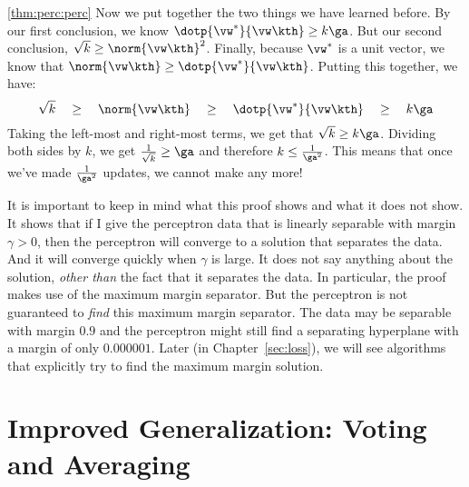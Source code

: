 \begin{myproof}{\ref{thm:perc:perc}}
  Now we put together the two things we have learned before.  By our
  first conclusion, we know $\dotp{\vw^*}{\vw\kth} \geq k \ga$.  But
  our second conclusion, $\sqrt{k} \geq \norm{\vw\kth}^2$.  Finally,
  because $\vw^*$ is a unit vector, we know that $\norm{\vw\kth} \geq
  \dotp{\vw^*}{\vw\kth}$.  Putting this together, we have:
  \begin{equation}
    \sqrt k 
    \quad\geq\quad
    \norm{\vw\kth}
    \quad\geq\quad
    \dotp{\vw^*}{\vw\kth}
    \quad\geq\quad
    k\ga
  \end{equation}
  Taking the left-most and right-most terms, we get that $\sqrt{k}
  \geq k \ga$.  Dividing both sides by $k$, we get $\frac 1 {\sqrt{k}}
  \geq \ga$ and therefore $k \leq \frac 1 {\ga^2}$.  This means
  that once we've made $\frac 1 {\ga^2}$ updates, we cannot make
  any more!
\end{myproof}



It is important to keep in mind what this proof shows and what it does
not show.  It shows that if I give the perceptron data that is
linearly separable with margin $\gamma > 0$, then the perceptron will
converge to a solution that separates the data.  And it will converge
quickly when $\gamma$ is large.  It does not say anything about the
solution, \emph{other than} the fact that it separates the data.  In
particular, the proof makes use of the maximum margin separator.  But
the perceptron is not guaranteed to \emph{find} this maximum margin
separator.  The data may be separable with margin $0.9$ and the
perceptron might still find a separating hyperplane with a margin of
only $0.000001$.  Later (in Chapter~\ref{sec:loss}), we will see
algorithms that explicitly try to find the maximum margin solution.


\section{Improved Generalization: Voting and Averaging}

